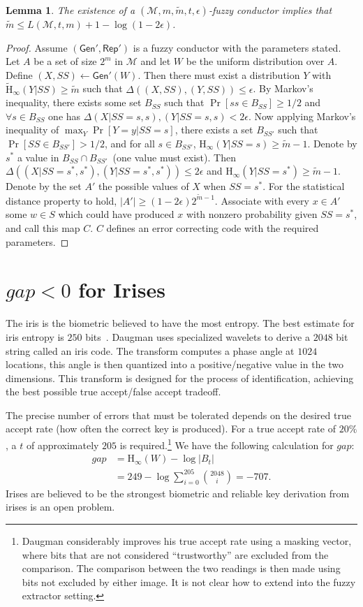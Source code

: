 \documentclass[11pt]{article}
\newcommand{\class}[1]{{\ensuremath{\mathsf{#1}}}}
\newcommand{\gen}{\ensuremath{\class{Gen}}\xspace}
\newcommand{\rep}{\ensuremath{\class{Rep}}\xspace}
\newcommand{\Hoo}{\mathrm{H}_\infty}
\newcommand{\Hav}{\tilde{\mathrm{H}}_\infty}
\newtheorem{lemma}[theorem]{Lemma}
\begin{document}
\begin{lemma}
The existence of a $(\mathcal{M}, m, \tilde{m}, t, \epsilon)$-fuzzy conductor implies that $\tilde{m}\leq L(\mathcal{M}, t, m) +1 -\log (1-2\epsilon)$.
\end{lemma}
\begin{proof}  Assume $(\gen', \rep')$ is a fuzzy conductor with the parameters stated.  Let $A$ be a set of size $2^m$ in $\mathcal{M}$ and let $W$ be the uniform distribution over $A$.  Define $(X,SS) \leftarrow \gen'(W)$.  Then there must exist a distribution $Y$ with $\Hav(Y|SS) \geq \tilde{m}$ such that $\Delta((X,SS), (Y, SS))\leq \epsilon$.  By Markov's inequality, there exists some set $B_{SS}$ such that $\Pr[ss\in B_{SS}] \geq 1/2$ and $\forall s\in B_{SS}$ one has $\Delta(X | SS = s, s ), (Y | SS = s, s)<2\epsilon$.  Now applying Markov's inequality of $\max_{Y} \Pr[Y=y | SS=s]$, there exists a set $B_{SS'}$ such that $\Pr[SS\in B_{SS'}]>1/2$, and for all $s\in B_{SS'}$, $\Hoo(Y| SS =s ) \geq \tilde{m}-1$.  Denote by $s^*$ a value in $B_{SS}\cap B_{SS'}$~(one value must exist).  Then $\Delta((X | SS =s^* , s^*), (Y| SS = s^*, s^*))\leq 2\epsilon$ and $\Hoo(Y|SS=s^*)\geq \tilde{m}-1$.  Denote by the set $A'$ the possible values of $X$ when $SS=s^*$.  For the statistical distance property to hold, $|A'| \geq  (1-2\epsilon)2^{\tilde{m}-1}$.  Associate with every $x\in A'$ some $w\in S$ which could have produced $x$ with nonzero probability given $SS=s^*$, and call this map $C$.  $C$ defines an error correcting code with the required parameters.
\end{proof}

\section{$gap<0$ for Irises}
\label{sec:iris no key}
The iris is the biometric believed to have the most entropy.  The best estimate for iris entropy is $250$ bits~\cite{daugman2004}.  Daugman uses specialized wavelets to derive a $2048$ bit string called an iris code.  The transform computes a phase angle at $1024$ locations, this angle is then quantized into a positive/negative value in the two dimensions.  This transform is designed for the process of identification, achieving the best possible true accept/false accept tradeoff.  

The precise number of errors that must be tolerated depends on the desired true accept rate (how often the correct key is produced).  For a true accept rate of $20\%$, a $t$ of approximately $205$ is required.\footnote{Daugman considerably improves his true accept rate using a masking vector, where bits that are not considered ``trustworthy'' are excluded from the comparison.  The comparison between the two readings is then made using bits not excluded by either image.  It is not clear how to extend into the fuzzy extractor setting.}  We have the following calculation for $gap$:
\begin{align*}
gap &= \Hoo(W) - \log |B_t|\\
&= 249 - \log \sum_{i=0}^{205} {2048 \choose i} = -707.
\end{align*}
Irises are believed to be the strongest biometric and reliable key derivation from irises is an open problem.
\end{document}
